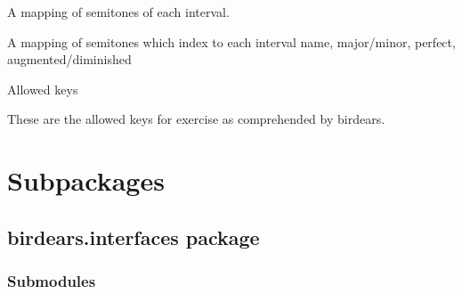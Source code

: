 \documentclass[letterpaper,10pt,english]{sphinxmanual}
\begin{document}

\begin{fulllineitems}
\label{\detokenize{birdears:birdears.INTERVAL_INDEX}}
 \textendash{} A mapping of semitones of each interval.

A mapping of semitones which index to each interval name, major/minor,
perfect, augmented/diminished

\end{fulllineitems}


\begin{fulllineitems}
\label{\detokenize{birdears:birdears.KEYS}}
 \textendash{} Allowed keys

These are the allowed keys for exercise as comprehended by birdears.

\end{fulllineitems}



\section{Subpackages}
\label{\detokenize{birdears:subpackages}}

\subsection{birdears.interfaces package}
\label{\detokenize{birdears.interfaces:birdears-interfaces-package}}\label{\detokenize{birdears.interfaces:module-birdears.interfaces}}\label{\detokenize{birdears.interfaces::doc}}

\subsubsection{Submodules}
\label{\detokenize{birdears.interfaces:submodules}}
\end{document}
